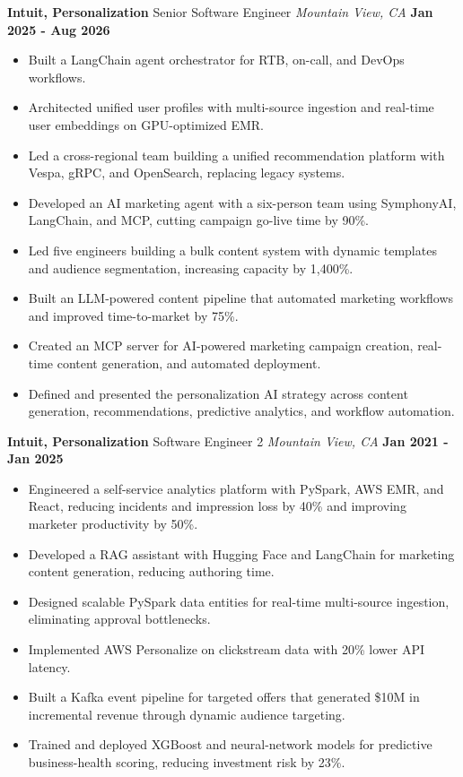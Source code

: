\documentclass[10pt, letterpaper]{article}
\newcommand{\jobentry}[4]{
  \noindent\textbf{#1} \hfill #2 \hfill \textit{#3} \hfill \textbf{#4}
}
\begin{document}
\jobentry{Intuit, Personalization}{Senior Software Engineer}{Mountain View, CA}{Jan 2025 - Aug 2026}
\begin{itemize}
\item Built a LangChain agent orchestrator for RTB, on-call, and DevOps workflows.
\item Architected unified user profiles with multi-source ingestion and real-time user embeddings on GPU-optimized EMR.
\item Led a cross-regional team building a unified recommendation platform with Vespa, gRPC, and OpenSearch, replacing legacy systems.
\item Developed an AI marketing agent with a six-person team using SymphonyAI, LangChain, and MCP, cutting campaign go-live time by 90\%.
\item Led five engineers building a bulk content system with dynamic templates and audience segmentation, increasing capacity by 1,400\%.
\item Built an LLM-powered content pipeline that automated marketing workflows and improved time-to-market by 75\%.
\item Created an MCP server for AI-powered marketing campaign creation, real-time content generation, and automated deployment.
\item Defined and presented the personalization AI strategy across content generation, recommendations, predictive analytics, and workflow automation.
\end{itemize}

\jobentry{Intuit, Personalization}{Software Engineer 2}{Mountain View, CA}{Jan 2021 - Jan 2025}
\begin{itemize}
\item Engineered a self-service analytics platform with PySpark, AWS EMR, and React, reducing incidents and impression loss by 40\% and improving marketer productivity by 50\%.
\item Developed a RAG assistant with Hugging Face and LangChain for marketing content generation, reducing authoring time.
\item Designed scalable PySpark data entities for real-time multi-source ingestion, eliminating approval bottlenecks.
\item Implemented AWS Personalize on clickstream data with 20\% lower API latency.
\item Built a Kafka event pipeline for targeted offers that generated \$10M in incremental revenue through dynamic audience targeting.
\item Trained and deployed XGBoost and neural-network models for predictive business-health scoring, reducing investment risk by 23\%.
\end{itemize}
\end{document}
